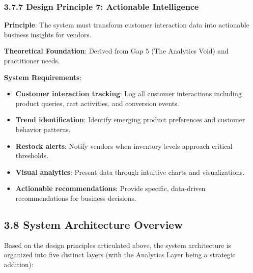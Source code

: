 \documentclass[12pt,a4paper]{article}
\begin{document}
\subsubsection{3.7.7 Design Principle 7: Actionable Intelligence}

\textbf{Principle}: The system must transform customer interaction data into actionable business insights for vendors.

\textbf{Theoretical Foundation}: Derived from Gap 5 (The Analytics Void) and practitioner needs.

\textbf{System Requirements}:

\begin{itemize}
    \item \textbf{Customer interaction tracking}: Log all customer interactions including product queries, cart activities, and conversion events.
    \item \textbf{Trend identification}: Identify emerging product preferences and customer behavior patterns.
    \item \textbf{Restock alerts}: Notify vendors when inventory levels approach critical thresholds.
    \item \textbf{Visual analytics}: Present data through intuitive charts and visualizations.
    \item \textbf{Actionable recommendations}: Provide specific, data-driven recommendations for business decisions.
\end{itemize}

\subsection{3.8 System Architecture Overview}

Based on the design principles articulated above, the system architecture is organized into five distinct layers (with the Analytics Layer being a strategic addition):
\end{document}
